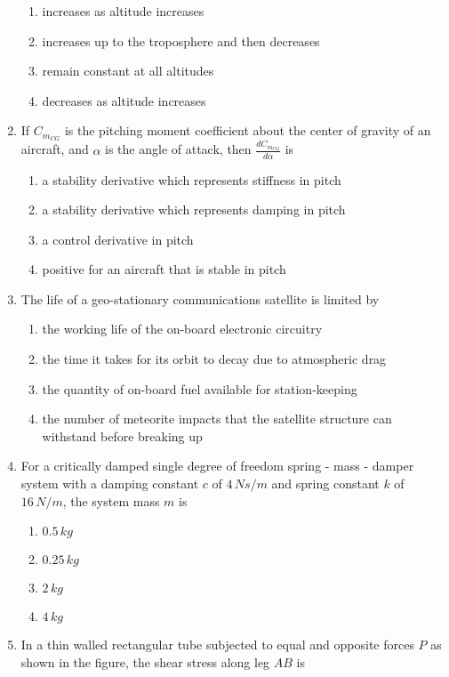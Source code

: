 \documentclass[journal]{IEEEtran}
\begin{document}
\begin{enumerate}
\begin{enumerate}
        \item increases as altitude increases
        \item increases up to the troposphere and then decreases
        \item remain constant at all altitudes
        \item decreases as altitude increases
    \end{enumerate}
    \item If $C_{m_{CG}}$ is the pitching moment coefficient about the center of gravity of an aircraft, and $\alpha$ is the angle of attack, then $\frac{dC_{m_{CG}}}{d\alpha}$ is
    \begin{enumerate}
        \item a stability derivative which represents stiffness in pitch
        \item a stability derivative which represents damping in pitch
        \item a control derivative in pitch
        \item positive for an aircraft that is stable in pitch
    \end{enumerate}
    \item The life of a geo-stationary communications satellite is limited by
    \begin{enumerate}
        \item the working life of the on-board electronic circuitry
        \item the time it takes for its orbit to decay due to atmospheric drag
        \item the quantity of on-board fuel available for station-keeping
        \item the number of meteorite impacts that the satellite structure can withstand before breaking up
    \end{enumerate}
    \item For a critically damped single degree of freedom spring - mass - damper system with a damping constant $c$ of $4\,Ns/m$ and spring constant $k$ of $16\,N/m$, the system mass $m$ is
    \begin{enumerate}
        \item $0.5\,kg$
        \item $0.25\,kg$
        \item $2\,kg$
        \item $4\,kg$
    \end{enumerate}
    \item In a thin walled rectangular tube subjected to equal and opposite forces $P$ as shown in the figure, the shear stress along leg $AB$ is


\end{enumerate}
\end{document}

